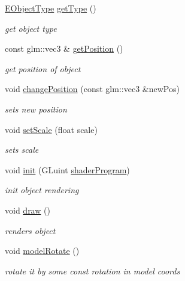 \begin{DoxyCompactItemize}
\mbox{\hyperlink{classkrizpav6_1_1_c_object_a54fa6c9a881bd5b3e1b4bc606444997f}{E\+Object\+Type}} \mbox{\hyperlink{classkrizpav6_1_1_c_object_a401c450df550f3bf8bc89cd7d2d87999}{get\+Type}} ()
\begin{DoxyCompactList}\small\item\em get object type \end{DoxyCompactList}\item 
const glm\+::vec3 \& \mbox{\hyperlink{classkrizpav6_1_1_c_object_a1586d4e3d355cb0aad673782b759bfb1}{get\+Position}} ()
\begin{DoxyCompactList}\small\item\em get position of object \end{DoxyCompactList}\item 
void \mbox{\hyperlink{classkrizpav6_1_1_c_object_a9c1b8830bfa5b82d30de2b3e2e868d7b}{change\+Position}} (const glm\+::vec3 \&new\+Pos)
\begin{DoxyCompactList}\small\item\em sets new position \end{DoxyCompactList}\item 
void \mbox{\hyperlink{classkrizpav6_1_1_c_object_a6248c1eecf10994a08fd481a4ec865f4}{set\+Scale}} (float scale)
\begin{DoxyCompactList}\small\item\em sets scale \end{DoxyCompactList}\item 
void \mbox{\hyperlink{classkrizpav6_1_1_c_object_a89b8ce0f8da3be70e99957510bb107b1}{init}} (G\+Luint \mbox{\hyperlink{namespacekrizpav6_a62f68ac39bd943907741993a8df24cfa}{shader\+Program}})
\begin{DoxyCompactList}\small\item\em init object rendering \end{DoxyCompactList}\item 
void \mbox{\hyperlink{classkrizpav6_1_1_c_object_aad40c775a0dda47f425bcc38235019a0}{draw}} ()
\begin{DoxyCompactList}\small\item\em renders object \end{DoxyCompactList}\item 
void \mbox{\hyperlink{classkrizpav6_1_1_c_object_a379afd3ab5d07d506038390d50f526a2}{model\+Rotate}} ()
\begin{DoxyCompactList}\small\item\em rotate it by some const rotation in model coords \end{DoxyCompactList}\item 

\end{DoxyCompactItemize}
